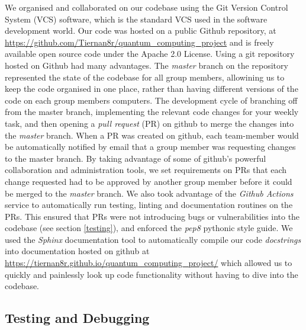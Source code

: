 \documentclass{article}
\begin{document}
We organised and collaborated on our codebase using the Git\cite{noauthor_git_nodate} Version Control System (VCS) software, which is the standard VCS used in the software development world.
Our code was hosted on a public Github\cite{noauthor_build_nodate} repository, at \url{https://github.com/Tiernan8r/quantum_computing_project} and is freely available open source code under the Apache 2.0 License\cite{noauthor_apache_nodate}.
Using a git repository hosted on Github had many advantages. The \textit{master} branch on the repository represented the state of the codebase for all group members, allowining us to keep the code organised in one place, rather than having different versions of the code on each group members computers.
The development cycle of branching off from the master branch, implementing the relevant code changes for your weekly task, and then opening a \textit{pull request} (PR) on github to merge the changes into the \textit{master} branch. 
When a PR was created on github, each team-member would be automatically notified by email that a group member was requesting changes to the master branch.
By taking advantage of some of github's powerful collaboration and administration tools, we set requirements on PRs that each change requested had to be approved by another group member before it could be merged to the \textit{master} branch.
We also took advantage of the \textit{Github Actions} service to automatically run testing, linting and documentation routines on the PRs. 
This ensured that PRs were not introducing bugs or vulnerabilities into the codebase (see section \ref{testing}), and enforced the \textit{pep8}\cite{noauthor_pep_nodate} pythonic style guide. 
We used the \textit{Sphinx}\cite{noauthor_overview_nodate} documentation tool to automatically compile our code \textit{docstrings} into documentation hosted on github at \url{https://tiernan8r.github.io/quantum_computing_project/} which allowed us to quickly and painlessly look up code functionality without having to dive into the codebase.

\subsection{\label{testing}Testing and Debugging}
\end{document}
